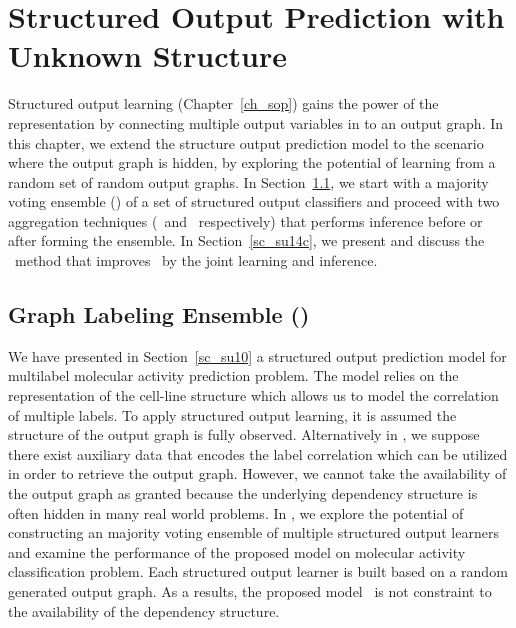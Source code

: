 {\fi











%
\chapter{Structured Output Prediction with Unknown Structure} \label{ch_sopw}

Structured output learning (Chapter~\ref{ch_sop}) gains the power of the representation by connecting multiple output variables in to an output graph.
In this chapter, we extend the structure output prediction model to the scenario where the output graph is hidden, by exploring the potential of learning from a random set of random output graphs.
In Section~\ref{sc_su11}, we start with a majority voting ensemble (\mve) of a set of structured output classifiers and proceed with two aggregation techniques (\amm\ and \mam\ respectively) that performs inference before or after forming the ensemble.
In Section~\ref{sc_su14c}, we present and discuss the \rta\ method that improves \mam\ by the joint learning and inference.


%
%
\section{Graph Labeling Ensemble (\mve)}\label{sc_su11}

We have presented in Section~\ref{sc_su10} a structured output prediction model for multilabel molecular activity prediction problem.
The model relies on the representation of the cell-line structure which allows us to model the correlation of multiple labels.
To apply structured output learning, it is assumed the structure of the output graph is fully observed.
Alternatively in , we suppose there exist auxiliary data that encodes the label correlation which can be utilized in order to retrieve the output graph.
However, we cannot take the availability of the output graph as granted because the underlying dependency structure is often hidden in many real world problems.
In , we explore the potential of constructing an majority voting ensemble of multiple structured output learners and examine the performance of the proposed model on molecular activity classification problem.
Each structured output learner is built based on a random generated output graph.
As a results, the proposed model \mve\ is not constraint to the availability of the dependency structure.



}
